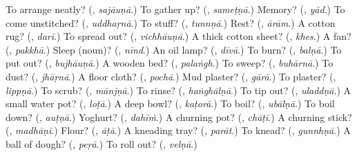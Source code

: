 \begin{tcolorbox}[breakable,colback=teal!4,colframe=teal!35!black,title={Before you move on}]
To arrange neatly? (\textbf{}, \emph{sajāuṇā}.) To gather up? (\textbf{}, \emph{sameṭṇā}.) Memory? (\textbf{}, \emph{yād}.) To come unstitched? (\textbf{}, \emph{uddhaṛnā}.) To stuff? (\textbf{}, \emph{tunnṇā}.) Rest? (\textbf{}, \emph{ārām}.) A cotton rug? (\textbf{}, \emph{darī}.) To spread out? (\textbf{}, \emph{vichhāuṇā}.) A thick cotton sheet? (\textbf{}, \emph{khes}.) A fan? (\textbf{}, \emph{pakkhā}.) Sleep (noun)? (\textbf{}, \emph{nīnd}.) An oil lamp? (\textbf{}, \emph{dīvā}.) To burn? (\textbf{}, \emph{balṇā}.) To put out? (\textbf{}, \emph{bujhāuṇā}.) A wooden bed? (\textbf{}, \emph{palaṅgh}.) To sweep? (\textbf{}, \emph{buhārnā}.) To dust? (\textbf{}, \emph{jhāṛnā}.) A floor cloth? (\textbf{}, \emph{pochā}.) Mud plaster? (\textbf{}, \emph{gārā}.) To plaster? (\textbf{}, \emph{lippṇā}.) To scrub? (\textbf{}, \emph{mānjṇā}.) To rinse? (\textbf{}, \emph{haṅghālṇā}.) To tip out? (\textbf{}, \emph{uladdṇā}.) A small water pot? (\textbf{}, \emph{loṭā}.) A deep bowl? (\textbf{}, \emph{kaṭorā}.) To boil? (\textbf{}, \emph{ubālṇā}.) To boil down? (\textbf{}, \emph{auṭṇā}.) Yoghurt? (\textbf{}, \emph{dahīṁ}.) A churning pot? (\textbf{}, \emph{chāṭī}.) A churning stick? (\textbf{}, \emph{madhāṇī}.) Flour? (\textbf{}, \emph{āṭā}.) A kneading tray? (\textbf{}, \emph{parāt}.) To knead? (\textbf{}, \emph{gunnhṇā}.) A ball of dough? (\textbf{}, \emph{peṛā}.) To roll out? (\textbf{}, \emph{velṇā}.)
\end{tcolorbox}

